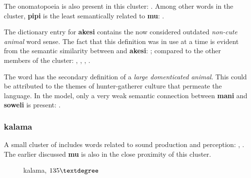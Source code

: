 \documentclass[14pt, a4paper]{extreport}
\makeatletter
\DeclareRobustCommand\ttfamily
        {\not@math@alphabet\ttfamily\mathtt
         \fontfamily\ttdefault\small\selectfont}
\makeatother
\begin{document}
The onomatopoeia  is also present in this cluster: . Among other words in the cluster, \textbf{pipi} is the least semantically related to \textbf{mu}: .

The dictionary entry for \textbf{akesi} contains the now considered outdated \textit{non-cute animal} word sense. The fact that this definition was in use at a time is evident from the semantic similarity between  and \textbf{akesi}: ; compared to the other members of the cluster: , , , .

The word  has the secondary definition of a \textit{large domenticated animal}. This could be attributed to the themes of hunter-gatherer culture that permeate the language. In the model, only a very weak semantic connection between \textbf{mani} and \textbf{soweli} is present: .

      \subsubsection{kalama}




A small cluster of  includes words related to sound production and perception: , . The earlier discussed \textbf{mu} is also in the close proximity of this cluster.

\begin{figure}[ht]%
  \def\angle{135}
  \bigskip
  \centering
  \caption{kalama, \(\angle\textdegree\)}
\end{figure}%
\end{document}
